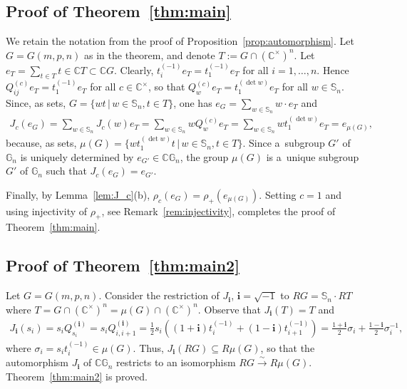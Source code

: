 \documentclass[pdftex]{sigma}
\newcommand{\g}[1]{t_{#1}^{(-1)}}
\begin{document}
\subsection*{Proof of Theorem~\ref{thm:main}} We retain the notation from the proof of
Proposition~\ref{prop:automorphism}.
Let $G=G(m,p,n)$ as in the theorem, and denote $T:=G\cap (\mathbb C^\times)^n$.
Let $e_T=\sum\limits_{t\in T}t\in \mathbb C T\subset \mathbb C G$.
Clearly, $\g ie_T=\g 1e_T$ for all $i=1,\ldots,n$.
Hence $Q_{ij}^{(c)}e_T=\g1e_T$ for all $c\in\mathbb C^\times$, so that $Q_w^{(c)}e_T=t_1^{(\det w)}e_T$ for all $w\in
\mathbb S_n$.
Since, as sets, $G=\{wt \,|\, w\in \mathbb S_n, t\in T\}$, one has $e_G=\sum\limits_{w\in\mathbb S_n}w\cdot e_T$ and
\begin{gather*}
J_c(e_G)= \sum\limits_{w\in \mathbb S_n} J_c(w)e_T = \sum\limits_{w\in \mathbb S_n} wQ_w^{(c)}e_T =\sum\limits_{w\in
\mathbb S_n} wt_1^{(\det w)}e_T = e_{\mu(G)},
\end{gather*}
because, as sets, $\mu(G)=\big\{wt_1^{(\det w)} t \,|\, w\in \mathbb S_n, t\in T\big\}$.
Since a~subgroup $G'$ of $\mathbb G_n$ is uniquely determined by $e_{G'}\in\mathbb C \mathbb G_n$, the group $\mu(G)$ is
a~unique subgroup $G'$ of $\mathbb G_n$ such that $J_c(e_G)=e_{G'}$.

Finally, by Lemma~\ref{lem:J_c}(b), $\rho_c(e_G)=\rho_+(e_{\mu(G)})$.
Setting $c=1$ and using injectivity of $\rho_+$, see Remark~\ref{rem:injectivity}, completes the proof of
Theorem~\ref{thm:main}.


\subsection*{Proof of Theorem~\ref{thm:main2}} Let $G=G(m,p,n)$.
Consider the restriction of $J_\mathbf{i}$, $\mathbf{i}=\sqrt{-1}$ to $R G=\mathbb S_n\cdot R T$ where $T=G\cap (\mathbb
C^\times)^n=\mu(G)\cap (\mathbb C^\times)^n$.
Observe that $J_\mathbf{i}(T)=T$ and
\begin{gather*}
J_\mathbf{i}(s_i)=s_iQ_{s_i}^{(\mathbf{i})}=s_i Q_{i,i+1}^{(\mathbf{i})}
=\frac12 s_i\left((1+\mathbf{i})t_i^{(-1)}+(1-\mathbf{i})t_{i+1}^{(-1)}\right)
=\frac{1+\mathbf{i}}{2}\sigma_i+\frac{1-\mathbf{i}}{2}\sigma_i^{-1},
\end{gather*}
where $\sigma_i=s_i t_i^{(-1)}\in \mu(G)$.
Thus, $J_\mathbf{i}(R G)\subseteq R\mu(G)$, so that the automorphism $J_\mathbf{i}$ of $\mathbb C \mathbb G_n$ restricts
to an isomorphism $R G \xrightarrow{\sim} R \mu(G)$.
Theorem~\ref{thm:main2} is proved.
\end{document}
